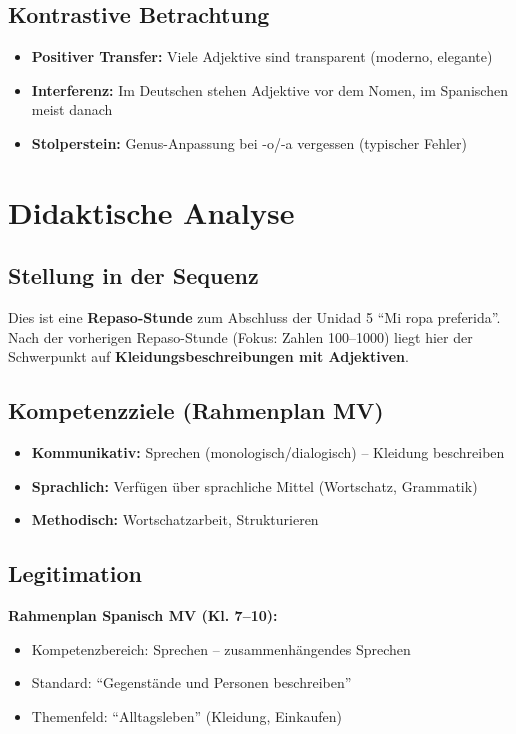 \documentclass[11pt,a4paper]{article}
\begin{document}
\subsection{Kontrastive Betrachtung}
\begin{itemize}
    \item \textbf{Positiver Transfer:} Viele Adjektive sind transparent (moderno, elegante)
    \item \textbf{Interferenz:} Im Deutschen stehen Adjektive vor dem Nomen, im Spanischen meist danach
    \item \textbf{Stolperstein:} Genus-Anpassung bei -o/-a vergessen (typischer Fehler)
\end{itemize}

\section{Didaktische Analyse}

\subsection{Stellung in der Sequenz}
Dies ist eine \textbf{Repaso-Stunde} zum Abschluss der Unidad 5 ``Mi ropa preferida''. Nach der vorherigen Repaso-Stunde (Fokus: Zahlen 100--1000) liegt hier der Schwerpunkt auf \textbf{Kleidungsbeschreibungen mit Adjektiven}.

\subsection{Kompetenzziele (Rahmenplan MV)}
\begin{itemize}
    \item \textbf{Kommunikativ:} Sprechen (monologisch/dialogisch) -- Kleidung beschreiben
    \item \textbf{Sprachlich:} Verfügen über sprachliche Mittel (Wortschatz, Grammatik)
    \item \textbf{Methodisch:} Wortschatzarbeit, Strukturieren
\end{itemize}

\subsection{Legitimation}
\textbf{Rahmenplan Spanisch MV (Kl. 7--10):}
\begin{itemize}
    \item Kompetenzbereich: Sprechen -- zusammenhängendes Sprechen
    \item Standard: ``Gegenstände und Personen beschreiben''
    \item Themenfeld: ``Alltagsleben'' (Kleidung, Einkaufen)
\end{itemize}
\end{document}
